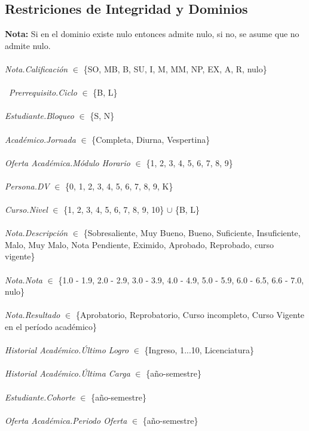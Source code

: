 \documentclass[12pt]{article}
\begin{document}
\subsection*{Restriciones de Integridad y Dominios}
\textbf{Nota:} Si en el dominio existe nulo entonces admite nulo, si no, se asume que no admite nulo.\\\\
\textit{Nota.Calificación} $\in$ \{SO, MB, B, SU, I, M, MM, NP, EX, A, R, nulo\}\\\\\
\textit{Prerrequisito.Ciclo} $\in$ \{B, L\}\\\\
\textit{Estudiante.Bloqueo} $\in$ \{S, N\}\\\\
\textit{Académico.Jornada} $\in$ \{Completa, Diurna, Vespertina\}\\\\
\textit{Oferta Académica.Módulo Horario} $\in$ \{1, 2, 3, 4, 5, 6, 7, 8, 9\}\\\\
\textit{Persona.DV} $\in$ \{0, 1, 2, 3, 4, 5, 6, 7, 8, 9, K\}\\\\
\textit{Curso.Nivel} $\in$ \{1, 2, 3, 4, 5, 6, 7, 8, 9, 10\} $\cup$ \{B, L\}\\\\
\textit{Nota.Descripción} $\in$ \{Sobresaliente, Muy Bueno, Bueno, Suficiente, Insuficiente, Malo, Muy Malo, Nota Pendiente, Eximido, Aprobado, Reprobado, curso vigente\}\\\\
\textit{Nota.Nota} $\in$ \{1.0 - 1.9, 2.0 - 2.9, 3.0 - 3.9, 4.0 - 4.9, 5.0 - 5.9, 6.0 - 6.5, 6.6 - 7.0, nulo\}\\\\
\textit{Nota.Resultado} $\in$ \{Aprobatorio, Reprobatorio, Curso incompleto, Curso Vigente en el período académico\}\\\\
\textit{Historial Académico.Último Logro} $\in$ \{Ingreso, 1...10, Licenciatura\}\\\\
\textit{Historial Académico.Última Carga} $\in$ \{año-semestre\}\\\\
\textit{Estudiante.Cohorte} $\in$ \{año-semestre\}\\\\
\textit{Oferta Académica.Periodo Oferta} $\in$ \{año-semestre\} \newpage
\end{document}
